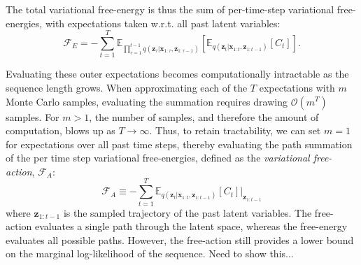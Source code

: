 The total variational free-energy is thus the sum of per-time-step variational free-energies, with expectations taken w.r.t. all past latent variables:
\begin{equation}
    \mathcal{F}_E = - \sum_{t=1}^T \mathbb{E}_{\prod_{\tau=1}^{t-1} q(\mathbf{z}_\tau | \mathbf{x}_{1:\tau} , \mathbf{z}_{1:\tau-1})} \left[ \mathbb{E}_{q(\mathbf{z}_t | \mathbf{x}_{1:t} , \mathbf{z}_{1:t-1})} \left[ C_t \right] \right].
\end{equation}

Evaluating these outer expectations becomes computationally intractable as the sequence length grows. When approximating each of the $T$ expectations with $m$ Monte Carlo samples, evaluating the summation requires drawing $\mathcal{O}(m^T)$ samples. For $m > 1$, the number of samples, and therefore the amount of computation, blows up as $T \rightarrow \infty$. Thus, to retain tractability, we can set $m=1$ for expectations over all past time steps, thereby evaluating the path summation of the per time step variational free-energies, defined as the \textit{variational free-action}, $\mathcal{F}_A$:
\begin{equation}
    \mathcal{F}_A \equiv - \sum_{t=1}^T \mathbb{E}_{q(\mathbf{z}_t | \mathbf{x}_{1:t} , \mathbf{z}_{1:t-1})} \left[ C_t \right] \bigg \vert_{\mathbf{z}_{1:t-1}}
\end{equation}
where $\mathbf{z}_{1:t-1}$ is the sampled trajectory of the past latent variables. The free-action evaluates a single path through the latent space, whereas the free-energy evaluates all possible paths. However, the free-action still provides a lower bound on the marginal log-likelihood of the sequence. Need to show this...
